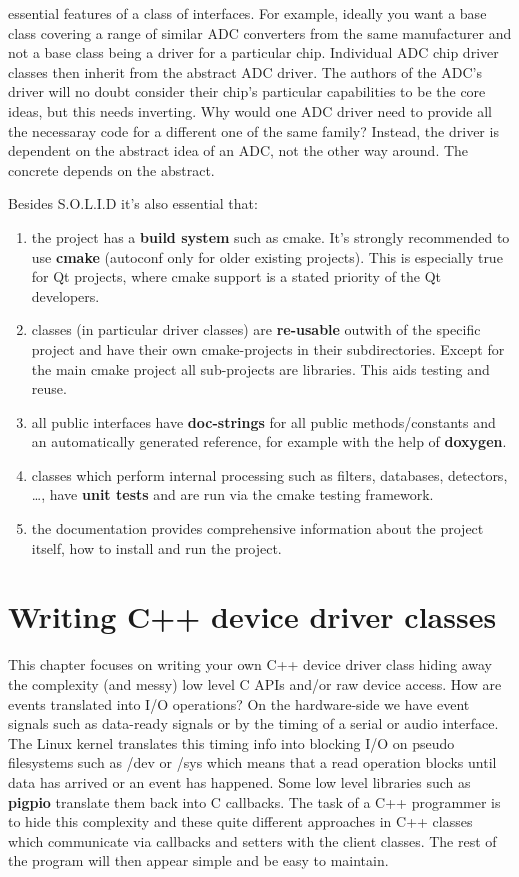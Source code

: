 \documentclass[12pt]{report}
\begin{document}
\begin{description}
  essential features of a class of interfaces. For example, ideally
  you want a base class covering a range of similar
  ADC converters from the same manufacturer and not a base class being
  a driver for a particular chip. Individual ADC chip driver
  classes then inherit from the abstract ADC driver. The authors of
  the ADC's driver will no doubt consider their chip's
  particular capabilities to be the core ideas,
  but this needs inverting. Why would one ADC driver need
  to provide all the necessaray code for a different one of the
  same family? Instead, the driver is dependent on the abstract
  idea of an ADC, not the other way around. The concrete depends
  on the abstract.
\end{description}


Besides S.O.L.I.D it's also essential that:
\begin{enumerate}
\item the project has a \textbf{build system} such as cmake. It's
  strongly recommended to use \textbf{cmake} (autoconf only for older existing
  projects). This is especially true for Qt projects, where cmake support
  is a stated priority of the Qt developers.
\item classes (in particular driver classes) are \textbf{re-usable}
  outwith of the specific project and have
  their own cmake-projects in their subdirectories. Except for the main
  cmake project all sub-projects are libraries. This aids testing and
  reuse.
\item all public interfaces have \textbf{doc-strings} for all public
  methods/constants and an automatically generated reference, for
  example with the help of \textbf{doxygen}.
\item classes which perform internal processing such as filters,
  databases, detectors, \ldots, have \textbf{unit tests} and are run via
  the cmake testing framework.
\item the documentation provides comprehensive information about the project itself,
  how to install and run the project.
\end{enumerate}


\chapter{Writing C++ device driver classes}
This chapter focuses on writing your own C++ device driver class
hiding away the complexity (and messy) low level C APIs and/or raw
device access. How are events translated into I/O operations? On the
hardware-side we have event signals such as data-ready signals or by
the timing of a serial or audio interface. The Linux kernel translates
this timing info into blocking I/O on pseudo filesystems such as /dev
or /sys which means that a read operation blocks until data has arrived
or an event has happened. Some low level libraries such as \textbf{pigpio}
translate them back into C callbacks. The task of a C++ programmer is
to hide this complexity and these quite different approaches in C++
classes which communicate via callbacks and setters with the client
classes. The rest of the program will then appear simple and be
easy to maintain.
\end{document}
